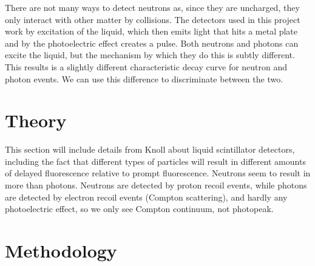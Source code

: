 \documentclass[11pt]{article}
\numberwithin{equation}{section}
\numberwithin{figure}{section}
\numberwithin{table}{section}
\begin{document}
\par There are not many ways to detect neutrons as, since they are uncharged, they only interact with other matter by collisions. The detectors used in this project work by excitation of the liquid, which then emits light that hits a metal plate and by the photoelectric effect creates a pulse. Both neutrons and photons can excite the liquid, but the mechanism by which they do this is subtly different. This results is a slightly different characteristic decay curve for neutron and photon events. We can use this difference to discriminate between the two.

\section{Theory}\label{sec:Theory}
\par This section will include details from Knoll about liquid scintillator detectors, including the fact that different types of particles will result in different amounts of delayed fluorescence relative to prompt fluorescence. Neutrons seem to result in more than photons. Neutrons are detected by proton recoil events, while photons are detected by electron recoil events (Compton scattering), and hardly any photoelectric effect, so we only see Compton continuum, not photopeak.
\par 

\section{Methodology}\label{sec:Methodology}




\begin{thebibliography}{9}

    
\end{thebibliography}
\end{document}
